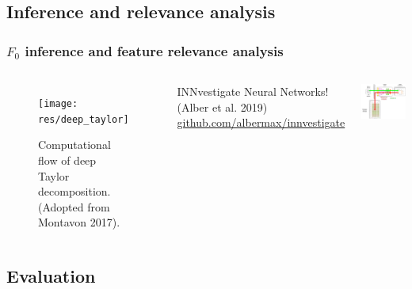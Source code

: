 \documentclass[a4paper,9pt]{beamer}
\theoremstyle{mytheoremstyle}
\begin{document}
\subsection{Inference and relevance analysis}

\begin{frame}
\frametitle{$F_{0}$ inference and feature relevance analysis}
\begin{columns}
\begin{figure}
\begin{center}
  \texttt{[image: res/deep\_taylor]}
\end{center}
	\caption{Computational flow of deep Taylor decomposition. (Adopted from Montavon 2017).}
\end{figure}
\scriptsize{
\begin{exampleblock}{}
{INNvestigate} Neural Networks!\\(Alber et al. 2019)\\
\vspace{1cm}
\url{github.com/albermax/innvestigate}
\vspace{0.2cm}
\end{exampleblock}
}
\includegraphics[width=\textwidth]{res/inference_and_relevance_analysis}
\end{columns}
\end{frame}

\subsection{Evaluation}
\end{document}
